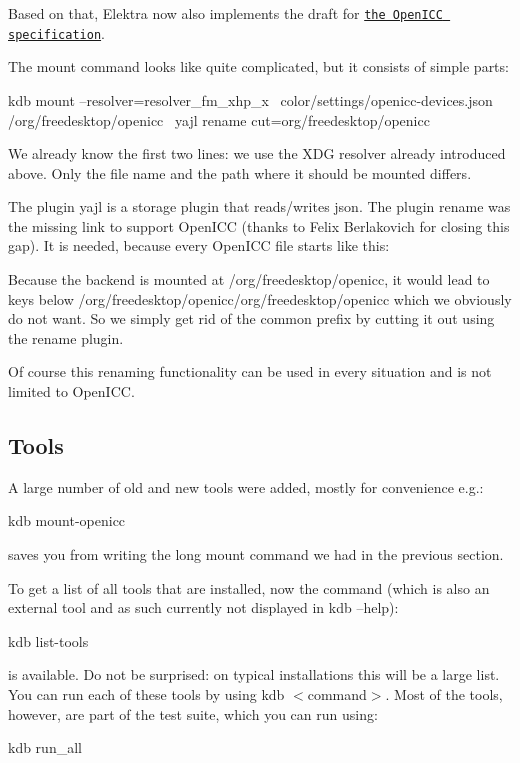 Based on that, Elektra now also implements the draft for \href{http://www.openicc.info/wiki/index.php?title=OpenICC_Configuration_0.1}{\tt the Open\+I\+C\+C specification}.

The mount command looks like quite complicated, but it consists of simple parts\+: \begin{DoxyVerb}kdb mount --resolver=resolver_fm_xhp_x \
  color/settings/openicc-devices.json /org/freedesktop/openicc \
  yajl rename cut=org/freedesktop/openicc
\end{DoxyVerb}


We already know the first two lines\+: we use the X\+D\+G resolver already introduced above. Only the file name and the path where it should be mounted differs.

The plugin yajl is a storage plugin that reads/writes json. The plugin rename was the missing link to support Open\+I\+C\+C (thanks to Felix Berlakovich for closing this gap). It is needed, because every Open\+I\+C\+C file starts like this\+: \begin{DoxyVerb}{ "org": { "freedesktop": { "openicc": {
\end{DoxyVerb}


Because the backend is mounted at /org/freedesktop/openicc, it would lead to keys below /org/freedesktop/openicc/org/freedesktop/openicc which we obviously do not want. So we simply get rid of the common prefix by cutting it out using the rename plugin.

Of course this renaming functionality can be used in every situation and is not limited to Open\+I\+C\+C.

\subsection*{Tools}

A large number of old and new tools were added, mostly for convenience e.\+g.\+: \begin{DoxyVerb}kdb mount-openicc
\end{DoxyVerb}


saves you from writing the long mount command we had in the previous section.

To get a list of all tools that are installed, now the command (which is also an external tool and as such currently not displayed in kdb --help)\+: \begin{DoxyVerb}kdb list-tools
\end{DoxyVerb}


is available. Do not be surprised\+: on typical installations this will be a large list. You can run each of these tools by using kdb $<$command$>$. Most of the tools, however, are part of the test suite, which you can run using\+: \begin{DoxyVerb}kdb run_all
\end{DoxyVerb}


